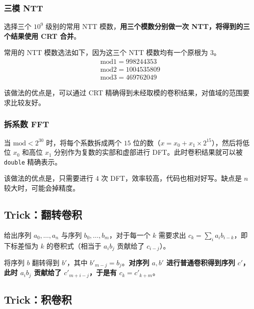 \subsubsection{三模 NTT}

选择三个 $10^9$ 级别的常用 NTT 模数，\textbf{用三个模数分别做一次 NTT，将得到的三个结果使用 CRT 合并}。

常用的 NTT 模数选法如下，因为这三个 NTT 模数均有一个原根为 $3$。
\[
\begin{aligned}
& \mathrm{mod}1 = 998244353 \\
& \mathrm{mod}2 = 1004535809 \\
& \mathrm{mod}3 = 469762049
\end{aligned}
\]

该做法的优点是，可以通过 CRT 精确得到未经取模的卷积结果，对值域的范围要求比较友好。


\subsubsection{拆系数 FFT}

当 $\mathrm{mod} < 2^{30}$ 时，将每个系数拆成两个 $15$ 位的数（$x = x_0 + x_1 \times 2^{15}$），然后将低位 $x_0$ 和高位 $x_1$ 分别作为复数的实部和虚部进行 DFT。此时卷积结果就可以被 \texttt{double} 精确表示。

该做法的优点是，只需要进行 $4$ 次 DFT，效率较高，代码也相对好写。缺点是 $n$ 较大时，可能会掉精度。


\subsection{Trick：翻转卷积}

给出序列 $a_0, \dots, a_n$ 与序列 $b_0, \dots, b_m$，对于每一个 $k$ 需要求出 $c_k = \sum_{i} a_ib_{i - k}$，即下标差恒为 $k$ 的卷积式（相当于 $a_ib_j$ 贡献给了 $c_{i - j}$）。

将序列 $b$ 翻转得到 $b'$，其中 $b'_{m - j} = b_j$。\textbf{对序列 $a, b'$ 进行普通卷积得到序列 $c'$，此时 $a_ib_j$ 贡献给了 $c'_{m + i - j}$，于是有 $c_k = c'_{k + m}$}。

\subsection{Trick：积卷积}

